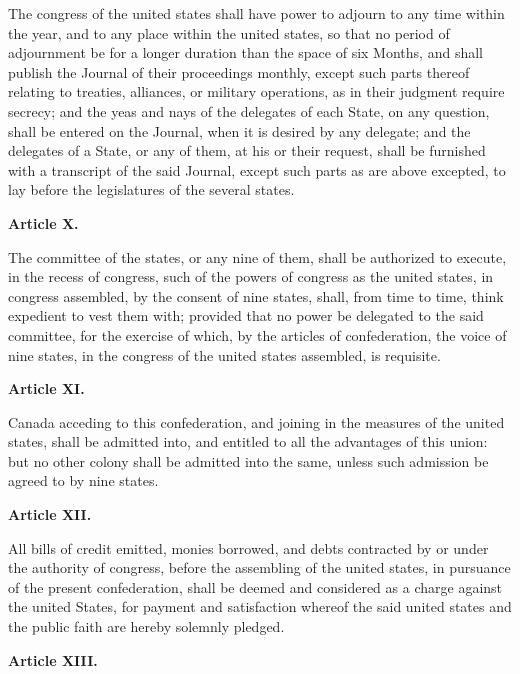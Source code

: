 The congress of the united states shall have power to adjourn to any time within the year, and to any place within the united states, so that no period of adjournment be for a longer duration than the space of six Months, and shall publish the Journal of their proceedings monthly, except such parts thereof relating to treaties, alliances, or military operations, as in their judgment require secrecy; and the yeas and nays of the delegates of each State, on any question, shall be entered on the Journal, when it is desired by any delegate; and the delegates of a State, or any of them, at his or their request, shall be furnished with a transcript of the said Journal, except such parts as are above excepted, to lay before the legislatures of the several states.

\begin{center}
\textbf{Article X.} 
\end{center}

The committee of the states, or any nine of them, shall be authorized to execute, in the recess of congress, such of the powers of congress as the united states, in congress assembled, by the consent of nine states, shall, from time to time, think expedient to vest them with; provided that no power be delegated to the said committee, for the exercise of which, by the articles of confederation, the voice of nine states, in the congress of the united states assembled, is requisite.

\begin{center}
\textbf{Article XI.} 
\end{center}

Canada acceding to this confederation, and joining in the measures of the united states, shall be admitted into, and entitled to all the advantages of this union: but no other colony shall be admitted into the same, unless such admission be agreed to by nine states.

\begin{center}
\textbf{Article XII.} 
\end{center}

All bills of credit emitted, monies borrowed, and debts contracted by or under the authority of congress, before the assembling of the united states, in pursuance of the present confederation, shall be deemed and considered as a charge against the united States, for payment and satisfaction whereof the said united states and the public faith are hereby solemnly pledged.

\begin{center}
\textbf{Article XIII.} 
\end{center}

